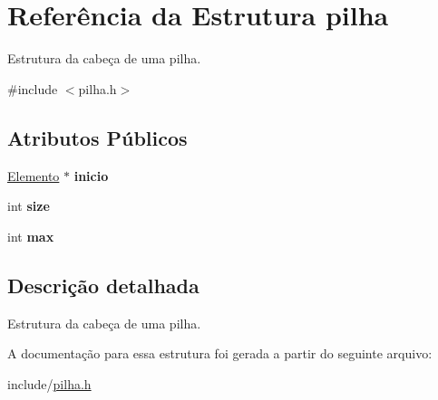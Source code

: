 \hypertarget{structpilha}{}\section{Referência da Estrutura pilha}
\label{structpilha}


Estrutura da cabeça de uma pilha.  




{\ttfamily \#include $<$pilha.\+h$>$}

\subsection*{Atributos Públicos}
\begin{DoxyCompactItemize}
\item 
\mbox{\label{structpilha_ae1f70063014c54f52ece835d1cb19406}} 
\mbox{\hyperlink{pilha_8h_aa472ad5ba3a076fcce5ed442b8f8052d}{Elemento}} $\ast$ {\bfseries inicio}
\item 
\mbox{\label{structpilha_ab6f3f9be9c7f94fd0630d4ab5552babe}} 
int {\bfseries size}
\item 
\mbox{\label{structpilha_a3f205f879db44103326097d85b3608fe}} 
int {\bfseries max}
\end{DoxyCompactItemize}


\subsection{Descrição detalhada}
Estrutura da cabeça de uma pilha. 

A documentação para essa estrutura foi gerada a partir do seguinte arquivo\+:\begin{DoxyCompactItemize}
\item 
include/\mbox{\hyperlink{pilha_8h}{pilha.\+h}}\end{DoxyCompactItemize}
